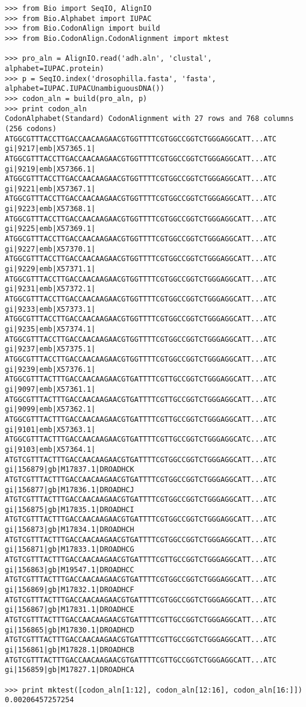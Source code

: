 \documentclass{article}
\begin{document}
\begin{verbatim}
>>> from Bio import SeqIO, AlignIO
>>> from Bio.Alphabet import IUPAC
>>> from Bio.CodonAlign import build
>>> from Bio.CodonAlign.CodonAlignment import mktest

>>> pro_aln = AlignIO.read('adh.aln', 'clustal', alphabet=IUPAC.protein)
>>> p = SeqIO.index('drosophilla.fasta', 'fasta', alphabet=IUPAC.IUPACUnambiguousDNA())
>>> codon_aln = build(pro_aln, p)
>>> print codon_aln
CodonAlphabet(Standard) CodonAlignment with 27 rows and 768 columns (256 codons)
ATGGCGTTTACCTTGACCAACAAGAACGTGGTTTTCGTGGCCGGTCTGGGAGGCATT...ATC gi|9217|emb|X57365.1|
ATGGCGTTTACCTTGACCAACAAGAACGTGGTTTTCGTGGCCGGTCTGGGAGGCATT...ATC gi|9219|emb|X57366.1|
ATGGCGTTTACCTTGACCAACAAGAACGTGGTTTTCGTGGCCGGTCTGGGAGGCATT...ATC gi|9221|emb|X57367.1|
ATGGCGTTTACCTTGACCAACAAGAACGTGGTTTTCGTGGCCGGTCTGGGAGGCATT...ATC gi|9223|emb|X57368.1|
ATGGCGTTTACCTTGACCAACAAGAACGTGGTTTTCGTGGCCGGTCTGGGAGGCATT...ATC gi|9225|emb|X57369.1|
ATGGCGTTTACCTTGACCAACAAGAACGTGGTTTTCGTGGCCGGTCTGGGAGGCATT...ATC gi|9227|emb|X57370.1|
ATGGCGTTTACCTTGACCAACAAGAACGTGGTTTTCGTGGCCGGTCTGGGAGGCATT...ATC gi|9229|emb|X57371.1|
ATGGCGTTTACCTTGACCAACAAGAACGTGGTTTTCGTGGCCGGTCTGGGAGGCATT...ATC gi|9231|emb|X57372.1|
ATGGCGTTTACCTTGACCAACAAGAACGTGGTTTTCGTGGCCGGTCTGGGAGGCATT...ATC gi|9233|emb|X57373.1|
ATGGCGTTTACCTTGACCAACAAGAACGTGGTTTTCGTGGCCGGTCTGGGAGGCATT...ATC gi|9235|emb|X57374.1|
ATGGCGTTTACCTTGACCAACAAGAACGTGGTTTTCGTGGCCGGTCTGGGAGGCATT...ATC gi|9237|emb|X57375.1|
ATGGCGTTTACCTTGACCAACAAGAACGTGGTTTTCGTGGCCGGTCTGGGAGGCATT...ATC gi|9239|emb|X57376.1|
ATGGCGTTTACTTTGACCAACAAGAACGTGATTTTCGTTGCCGGTCTGGGAGGCATT...ATC gi|9097|emb|X57361.1|
ATGGCGTTTACTTTGACCAACAAGAACGTGATTTTCGTTGCCGGTCTGGGAGGCATT...ATC gi|9099|emb|X57362.1|
ATGGCGTTTACTTTGACCAACAAGAACGTGATTTTCGTTGCCGGTCTGGGAGGCATT...ATC gi|9101|emb|X57363.1|
ATGGCGTTTACTTTGACCAACAAGAACGTGATTTTCGTTGCCGGTCTGGGAGGCATC...ATC gi|9103|emb|X57364.1|
ATGTCGTTTACTTTGACCAACAAGAACGTGATTTTCGTGGCCGGTCTGGGAGGCATT...ATC gi|156879|gb|M17837.1|DROADHCK
ATGTCGTTTACTTTGACCAACAAGAACGTGATTTTCGTGGCCGGTCTGGGAGGCATT...ATC gi|156877|gb|M17836.1|DROADHCJ
ATGTCGTTTACTTTGACCAACAAGAACGTGATTTTCGTGGCCGGTCTGGGAGGCATT...ATC gi|156875|gb|M17835.1|DROADHCI
ATGTCGTTTACTTTGACCAACAAGAACGTGATTTTCGTGGCCGGTCTGGGAGGCATT...ATC gi|156873|gb|M17834.1|DROADHCH
ATGTCGTTTACTTTGACCAACAAGAACGTGATTTTCGTGGCCGGTCTGGGAGGCATT...ATC gi|156871|gb|M17833.1|DROADHCG
ATGTCGTTTACTTTGACCAACAAGAACGTGATTTTCGTTGCCGGTCTGGGAGGCATT...ATC gi|156863|gb|M19547.1|DROADHCC
ATGTCGTTTACTTTGACCAACAAGAACGTGATTTTCGTGGCCGGTCTGGGAGGCATT...ATC gi|156869|gb|M17832.1|DROADHCF
ATGTCGTTTACTTTGACCAACAAGAACGTGATTTTCGTGGCCGGTCTGGGAGGCATT...ATC gi|156867|gb|M17831.1|DROADHCE
ATGTCGTTTACTTTGACCAACAAGAACGTGATTTTCGTTGCCGGTCTGGGAGGCATT...ATC gi|156865|gb|M17830.1|DROADHCD
ATGTCGTTTACTTTGACCAACAAGAACGTGATTTTCGTTGCCGGTCTGGGAGGCATT...ATC gi|156861|gb|M17828.1|DROADHCB
ATGTCGTTTACTTTGACCAACAAGAACGTGATTTTCGTTGCCGGTCTGGGAGGCATT...ATC gi|156859|gb|M17827.1|DROADHCA

>>> print mktest([codon_aln[1:12], codon_aln[12:16], codon_aln[16:]])
0.00206457257254
\end{verbatim}
\end{document}
